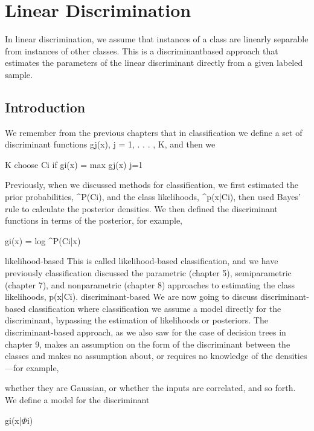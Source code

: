 \chapter{Linear Discrimination}
\label{chap:10-linear-discrimination}

In linear discrimination, we assume that instances of a class are linearly separable from instances of other classes. This is a discriminantbased approach that estimates the parameters of the linear discriminant directly from a given labeled sample.

\section{Introduction}

We remember from the previous chapters that in classification we define a set of discriminant functions gj(x), j = 1, . . . , K, and then we

K choose Ci if gi(x) = max gj(x) j=1

Previously, when we discussed methods for classification, we first estimated the prior probabilities, \textasciicircum{}P(Ci), and the class likelihoods, \textasciicircum{}p(x|Ci), then used Bayes’ rule to calculate the posterior densities. We then defined the discriminant functions in terms of the posterior, for example,

gi(x) = log \textasciicircum{}P(Ci|x)

likelihood-based This is called likelihood-based classification, and we have previously classification discussed the parametric (chapter 5), semiparametric (chapter 7), and nonparametric (chapter 8) approaches to estimating the class likelihoods, p(x|Ci). discriminant-based We are now going to discuss discriminant-based classification where classification we assume a model directly for the discriminant, bypassing the estimation of likelihoods or posteriors. The discriminant-based approach, as we also saw for the case of decision trees in chapter 9, makes an assumption on the form of the discriminant between the classes and makes no assumption about, or requires no knowledge of the densities---for example,

whether they are Gaussian, or whether the inputs are correlated, and so forth. We define a model for the discriminant

gi(x|$\Phi$i)

